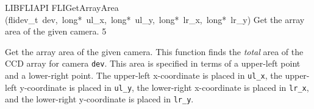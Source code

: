 \documentclass{article}
\begin{document}
\begin{cxxfunction}
{LIBFLIAPI}
        {FLIGetArrayArea}
        {(flidev\_t\ dev,\ long*\ ul\_x,\ long*\ ul\_y,\ long*\ lr\_x,\ long*\ lr\_y)}
        {
 Get the array area of the given camera.}
        {5}
\begin{cxxdoc}

Get the array area of the given camera.  This function finds the
\emph{total} area of the CCD array for camera \texttt{dev}.  This
area is specified in terms of a upper-left point and a lower-right
point.  The upper-left x-coordinate is placed in \texttt{ul\_x}, the
upper-left y-coordinate is placed in \texttt{ul\_y}, the lower-right
x-coordinate is placed in \texttt{lr\_x}, and the lower-right
y-coordinate is placed in \texttt{lr\_y}.


\end{cxxdoc}
\end{cxxfunction}
\end{document}
